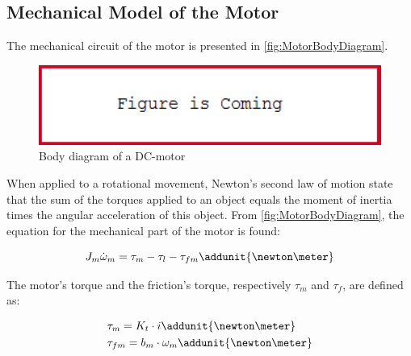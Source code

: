 \subsection*{Mechanical Model of the Motor}
The mechanical circuit of the motor is presented in \autoref{fig:MotorBodyDiagram}.

\begin{figure}[htbp]
	\centering
 	\includegraphics[width=1\textwidth]{figures/FigureIsComing.PNG} 
 	\caption{Body diagram of a DC-motor}
 	\label{fig:MotorBodyDiagram}
\end{figure}

When applied to a rotational movement, Newton's second law of motion state that the sum of the torques applied to an object equals the moment of inertia times the angular acceleration of this object. From \autoref{fig:MotorBodyDiagram}, the equation for the mechanical part of the motor is found:

\begin{equation}
	J_{m} \dot{\omega}_{m} = \tau_{m} - \tau_{l} - \tau_{fm} \addunit{\newton\meter}
	\label{eq:MotorMechanical}
\end{equation}

\startexplain
\stopexplain

The motor's torque and the friction's torque, respectively $\tau_m$ and $\tau_f$, are defined as:

\begin{subequations}\label{eq:tauLm}
	\begin{flalign}
		&\tau_m = K_t \cdot i \addunit{\newton\meter} \label{eq:MotorTorque}\\	
		&\tau_{fm} = b_{m}\cdot\omega_{m} \addunit{\newton\meter}	\label{eq:FrictionTorque}
	\end{flalign}
\end{subequations}

